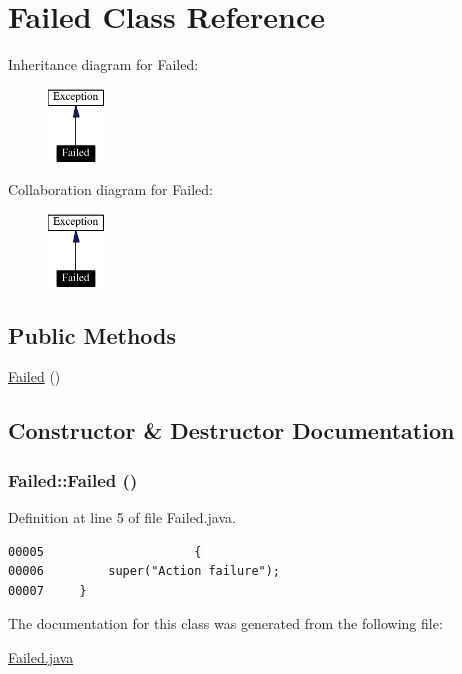 \hypertarget{classFailed}{
\section{Failed  Class Reference}
\label{classFailed}
}
Inheritance diagram for Failed:\begin{figure}[H]
\begin{center}
\leavevmode
\includegraphics[width=43pt]{classFailed__inherit__graph}
\end{center}
\end{figure}
Collaboration diagram for Failed:\begin{figure}[H]
\begin{center}
\leavevmode
\includegraphics[width=43pt]{classFailed__coll__graph}
\end{center}
\end{figure}
\subsection*{Public Methods}
\begin{CompactItemize}
\item 
\hyperlink{classFailed_a0}{Failed} ()
\end{CompactItemize}


\subsection{Constructor \& Destructor Documentation}
\hypertarget{classFailed_a0}{
\subsubsection[Failed]{\setlength{\rightskip}{0pt plus 5cm}Failed::Failed ()}}
\label{classFailed_a0}




Definition at line 5 of file Failed.java.\footnotesize\begin{verbatim}00005                     {
00006         super("Action failure");
00007     }
\end{verbatim}\normalsize 


The documentation for this class was generated from the following file:\begin{CompactItemize}
\item 
\hyperlink{Failed_8java-source}{Failed.java}\end{CompactItemize}
